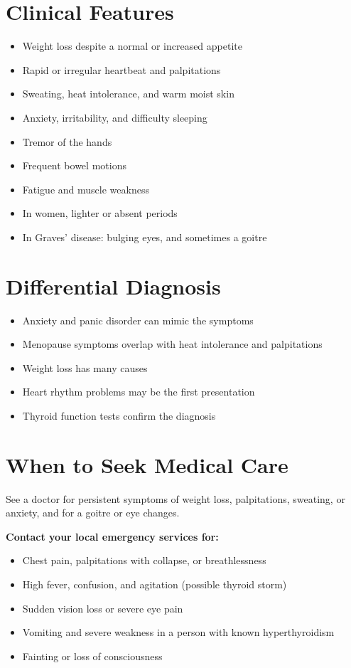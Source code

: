 \section*{Clinical Features}
\begin{itemize}
    \item Weight loss despite a normal or increased appetite
    \item Rapid or irregular heartbeat and palpitations
    \item Sweating, heat intolerance, and warm moist skin
    \item Anxiety, irritability, and difficulty sleeping
    \item Tremor of the hands
    \item Frequent bowel motions
    \item Fatigue and muscle weakness
    \item In women, lighter or absent periods
    \item In Graves' disease: bulging eyes, and sometimes a goitre
\end{itemize}

\section*{Differential Diagnosis}
\begin{itemize}
    \item Anxiety and panic disorder can mimic the symptoms
    \item Menopause symptoms overlap with heat intolerance and palpitations
    \item Weight loss has many causes
    \item Heart rhythm problems may be the first presentation
    \item Thyroid function tests confirm the diagnosis
\end{itemize}

\section*{When to Seek Medical Care}
See a doctor for persistent symptoms of weight loss, palpitations, sweating, or anxiety, and for a goitre or eye changes.

\textbf{Contact your local emergency services for:}
\begin{itemize}
    \item Chest pain, palpitations with collapse, or breathlessness
    \item High fever, confusion, and agitation (possible thyroid storm)
    \item Sudden vision loss or severe eye pain
    \item Vomiting and severe weakness in a person with known hyperthyroidism
    \item Fainting or loss of consciousness
\end{itemize}

